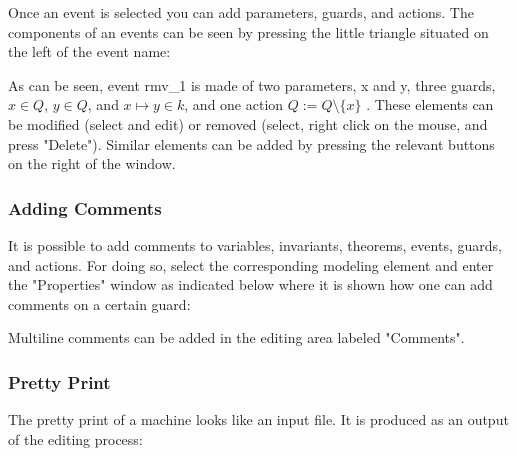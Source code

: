 Once an event is selected you can add parameters, guards, and actions. The components of an events can be seen by pressing the little triangle situated on the left of the event name: 


As can be seen, event rmv\_1 is made of two parameters, x and y, three guards, $x \in Q$, $y \in Q$, and $x \mapsto y \in k$, and one action $Q := Q \setminus \{ x\}$ . These elements can be modified (select and edit) or removed (select, right click on the mouse, and press "Delete"). Similar elements can be added by pressing the relevant buttons on the right of the window. 

\subsubsection{Adding Comments}

It is possible to add comments to variables, invariants, theorems, events, guards, and actions. For doing so, select the corresponding modeling element and enter the "Properties" window as indicated below where it is shown how one can add comments on a certain guard: 


Multiline comments can be added in the editing area labeled "Comments". 

\subsubsection{Pretty Print}

The pretty print of a machine looks like an input file. It is produced as an output of the editing process: 


